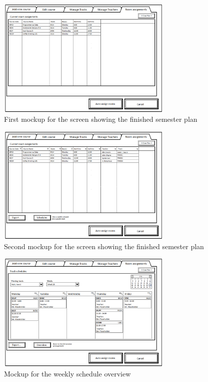 \begin{figure}[htb]
\begin{center}
\leavevmode
\includegraphics[width=0.75\textwidth]{images/courseplan_Room_Assignments}
\end{center}
\caption{First mockup for the screen showing the finished semester plan}
\label{fig:app2_mock1_5}
\end{figure}

\begin{figure}[htb]
\begin{center}
\leavevmode
\includegraphics[width=0.75\textwidth]{images/courseplan2_Room_Assignments}
\end{center}
\caption{Second mockup for the screen showing the finished semester plan}
\label{fig:app2_mock2_5}
\end{figure}

\begin{figure}[htb]
\begin{center}
\leavevmode
\includegraphics[width=0.75\textwidth]{images/courseplan2_Room_Assignments_schedules}
\end{center}
\caption{Mockup for the weekly schedule overview}
\label{fig:app2_mock2_6}
\end{figure}

